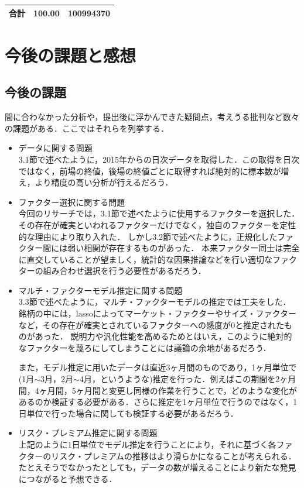 ﻿\documentclass[a4paper]{jarticle}
\begin{document}
\begin{table}[htbp]
\begin{center}
\begin{tabular}{|c|c|c|}
\hline
\hline
合計& 100.00 &  100994370\\
\hline
\end{tabular}
\end{center}
\label{tbl:port2}
\end{table}

\section{今後の課題と感想}
\subsection{今後の課題}
間に合わなかった分析や，提出後に浮かんできた疑問点，考えうる批判など数々の課題がある．ここではそれらを列挙する．

\begin{itemize}
\item{データに関する問題}\\
\quad 3.1節で述べたように，2015年からの日次データを取得した．この取得を日次ではなく，前場の終値，後場の終値ごとに取得すれば絶対的に標本数が増え，より精度の高い分析が行えるだろう．
\item{ファクター選択に関する問題}\\
\quad 今回のリサーチでは，3.1節で述べたように使用するファクターを選択した．
その存在が確実といわれるファクターだけでなく，独自のファクターを定性的な理由により取り入れた．
しかし3.2節で述べたように，正規化したファクター間には弱い相関が存在するものがあった．
本来ファクター同士は完全に直交していることが望ましく，統計的な因果推論などを行い適切なファクターの組み合わせ選択を行う必要性があるだろう．

\item{マルチ・ファクターモデル推定に関する問題}\\
\quad 3.3節で述べたように，マルチ・ファクターモデルの推定では工夫をした．
銘柄の中には，lassoによってマーケット・ファクターやサイズ・ファクターなど，その存在が確実とされているファクターへの感度が$0$と推定されたものがあった．
説明力や汎化性能を高めるためとはいえ，このように絶対的なファクターを蔑ろにしてしまうことには議論の余地があるだろう．

\quad また，モデル推定に用いたデータは直近3ヶ月間のものであり，1ヶ月単位で(1月$\sim$3月，2月$\sim$4月，というような)推定を行った．例えばこの期間を2ヶ月間，4ヶ月間，5ヶ月間と変更し同様の作業を行うことで，どのような変化があるのか検証する必要がある．さらに推定を1ヶ月単位で行うのではなく，1日単位で行った場合に関しても検証する必要があるだろう．
\item{リスク・プレミアム推定に関する問題}\\
\quad 上記のように1日単位でモデル推定を行うことにより，それに基づく各ファクターのリスク・プレミアムの推移はより滑らかになることが考えられる．
たとえそうでなかったとしても，データの数が増えることにより新たな発見につながると予想できる．


\end{itemize}
\end{document}
